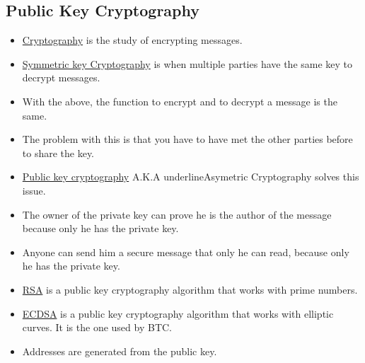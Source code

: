 \documentclass[a4paper, oneside]{book}
\begin{document}
\subsection{Public Key Cryptography}
\begin{itemize}
	\item \underline{Cryptography} is the study of encrypting messages.
	\item \underline{Symmetric key Cryptography} is when multiple parties have the same key to decrypt messages.
	\item With the above, the function to encrypt and to decrypt a message is the same.
	\item The problem with this is that you have to have met the other parties before to share the key.
	\item \underline{Public key cryptography} A.K.A underline{Asymetric Cryptography} solves this issue.
	\item The owner of the private key can prove he is the author of the message because only he has the private key.
	
	
	\item Anyone can send him a secure message that only he can read, because only he has the private key.
	
	
	\item \underline{RSA} is a public key cryptography algorithm that works with prime numbers.
	\item \underline{ECDSA} is a public key cryptography algorithm that works with elliptic curves. It is the one used by BTC.
	\item Addresses are generated from the public key.
\end{itemize}
\end{document}
